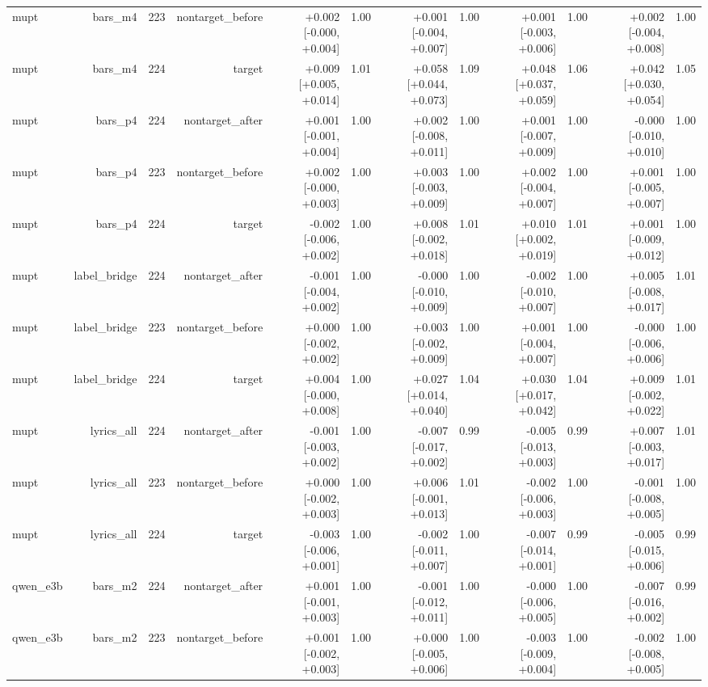 \begin{table}[t]
\begin{tabular}{lrrrrrrrrrrr}
mupt & bars\_m4 & 223 & nontarget\_before & +0.002 [-0.000, +0.004] & 1.00 & +0.001 [-0.004, +0.007] & 1.00 & +0.001 [-0.003, +0.006] & 1.00 & +0.002 [-0.004, +0.008] & 1.00 \\
mupt & bars\_m4 & 224 & target & +0.009 [+0.005, +0.014] & 1.01 & +0.058 [+0.044, +0.073] & 1.09 & +0.048 [+0.037, +0.059] & 1.06 & +0.042 [+0.030, +0.054] & 1.05 \\
mupt & bars\_p4 & 224 & nontarget\_after & +0.001 [-0.001, +0.004] & 1.00 & +0.002 [-0.008, +0.011] & 1.00 & +0.001 [-0.007, +0.009] & 1.00 & -0.000 [-0.010, +0.010] & 1.00 \\
mupt & bars\_p4 & 223 & nontarget\_before & +0.002 [-0.000, +0.003] & 1.00 & +0.003 [-0.003, +0.009] & 1.00 & +0.002 [-0.004, +0.007] & 1.00 & +0.001 [-0.005, +0.007] & 1.00 \\
mupt & bars\_p4 & 224 & target & -0.002 [-0.006, +0.002] & 1.00 & +0.008 [-0.002, +0.018] & 1.01 & +0.010 [+0.002, +0.019] & 1.01 & +0.001 [-0.009, +0.012] & 1.00 \\
mupt & label\_bridge & 224 & nontarget\_after & -0.001 [-0.004, +0.002] & 1.00 & -0.000 [-0.010, +0.009] & 1.00 & -0.002 [-0.010, +0.007] & 1.00 & +0.005 [-0.008, +0.017] & 1.01 \\
mupt & label\_bridge & 223 & nontarget\_before & +0.000 [-0.002, +0.002] & 1.00 & +0.003 [-0.002, +0.009] & 1.00 & +0.001 [-0.004, +0.007] & 1.00 & -0.000 [-0.006, +0.006] & 1.00 \\
mupt & label\_bridge & 224 & target & +0.004 [-0.000, +0.008] & 1.00 & +0.027 [+0.014, +0.040] & 1.04 & +0.030 [+0.017, +0.042] & 1.04 & +0.009 [-0.002, +0.022] & 1.01 \\
mupt & lyrics\_all & 224 & nontarget\_after & -0.001 [-0.003, +0.002] & 1.00 & -0.007 [-0.017, +0.002] & 0.99 & -0.005 [-0.013, +0.003] & 0.99 & +0.007 [-0.003, +0.017] & 1.01 \\
mupt & lyrics\_all & 223 & nontarget\_before & +0.000 [-0.002, +0.003] & 1.00 & +0.006 [-0.001, +0.013] & 1.01 & -0.002 [-0.006, +0.003] & 1.00 & -0.001 [-0.008, +0.005] & 1.00 \\
mupt & lyrics\_all & 224 & target & -0.003 [-0.006, +0.001] & 1.00 & -0.002 [-0.011, +0.007] & 1.00 & -0.007 [-0.014, +0.001] & 0.99 & -0.005 [-0.015, +0.006] & 0.99 \\
qwen\_e3b & bars\_m2 & 224 & nontarget\_after & +0.001 [-0.001, +0.003] & 1.00 & -0.001 [-0.012, +0.011] & 1.00 & -0.000 [-0.006, +0.005] & 1.00 & -0.007 [-0.016, +0.002] & 0.99 \\
qwen\_e3b & bars\_m2 & 223 & nontarget\_before & +0.001 [-0.002, +0.003] & 1.00 & +0.000 [-0.005, +0.006] & 1.00 & -0.003 [-0.009, +0.004] & 1.00 & -0.002 [-0.008, +0.005] & 1.00 \\

\end{tabular}
\end{table}
